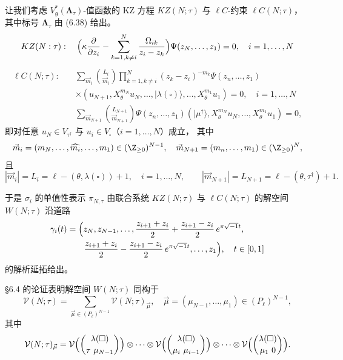 让我们考虑 $V_{\mathfrak{g}}^*(\mathbf{\Lambda}_\tau)$-值函数的 KZ 方程
$KZ(N;\tau)$ 与 $\ell C$-约束 $\ell C(N;\tau)$，其中标号
$\mathbf{\Lambda}_\tau$ 由 (6.38) 给出。
\[
KZ(N:\tau):\quad
\Bigl(\kappa\frac{\partial}{\partial z_i}
-\sum_{k=1,k\neq i}^{N}\frac{\Omega_{ik}}{z_i-z_k}\Bigr)
\Psi(z_N,\dots,z_1)=0,\quad i=1,\dots,N
\]
\begin{align*}
\ell C(N;\tau):\quad
&\sum_{\vec m_i}\binom{L_i}{\vec m_i}
\prod_{k=1,k\neq i}^{N}(z_k-z_i)^{-m_k}\Psi(z_n,\dots,z_1)\\
&\times(u_{N+1},X_\theta^{m_N}u_N,\dots,|\lambda(\square)\rangle,
\dots,X_\theta^{m_1}u_1)=0,\quad i=1,\dots,N\\
&\sum_{\vec m_{N+1}}\binom{L_{N+1}}{\vec m_{N+1}}
\Psi(z_n,\dots,z_1)(|\mu^\dagger\rangle,X_\theta^{m_N}u_N,
\dots,X_\theta^{m_1}u_1)=0,
\end{align*}
即对任意 $u_N\in V_{\tau^\dagger}$ 与 $u_i\in V_{\square}$（$i=1,\dots,N$）成立，
其中
\[
\vec m_i=(m_N,\dots,\widehat{m_i},\dots,m_1)\in(\Z_{\ge0})^{N-1},\quad
\vec m_{N+1}=(m_n,\dots,m_1)\in(\Z_{\ge0})^{N},
\]
且
\[
|\vec m_i|=L_i=\ell-(\theta,\lambda(\square))+1,\quad i=1,\dots,N,\qquad
|\vec m_{N+1}|=L_{N+1}=\ell-(\theta,\tau^\dagger)+1.
\]

于是 $\sigma_i$ 的单值性表示 $\pi_{N,\tau}$ 由联合系统 $KZ(N;\tau)$ 与
$\ell C(N;\tau)$ 的解空间 $W(N;\tau)$ 沿道路
\[
\begin{aligned}
\gamma_i(t)&=\Bigl(z_N,z_{N-1},\dots,
\frac{z_{i+1}+z_i}{2}+\frac{z_{i+1}-z_i}{2}\,e^{\pi\sqrt{-1}t},\\
&\qquad
\frac{z_{i+1}+z_i}{2}-\frac{z_{i+1}-z_i}{2}\,e^{\pi\sqrt{-1}t},
\dots,z_1\Bigr),\quad t\in[0,1]
\end{aligned}
\]
的解析延拓给出。

§6.4 的论证表明解空间 $W(N;\tau)$ 同构于
\[
\mathcal V(N;\tau)
=\sum_{\vec\mu\in(P_\ell)^{N-1}}\mathcal V(N;\tau)_{\vec\mu},
\quad \vec\mu=(\mu_{N-1},\dots,\mu_1)\in(P_\ell)^{N-1},
\]
其中
\[
\mathcal V(N;\tau)_{\vec\mu}
=\mathcal V\Bigl(\binom{\lambda(\square)}{\tau\ \mu_{N-1}}\Bigr)
\otimes\cdots\otimes
\mathcal V\Bigl(\binom{\lambda(\square)}{\mu_i\ \mu_{i-1}}\Bigr)
\otimes\cdots\otimes
\mathcal V\Bigl(\binom{\lambda(\square)}{\mu_1\ 0}\Bigr).
\]

